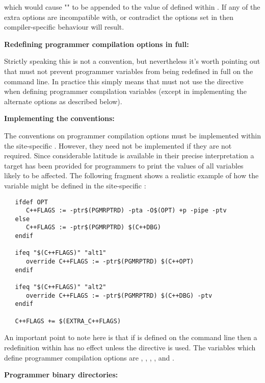 \noindent
which would cause "" to be appended to the value of
 defined within .  If any of the extra options
are incompatible with, or contradict the options set in  then
compiler-specific behaviour will result.

\textbf{Redefining programmer compilation options in full:}

Strictly speaking this is not a  convention, but nevertheless
it's worth pointing out that  must not prevent programmer
variables from being redefined in full on the  command line.  In
practice this simply means that  must not use the
 directive when defining programmer compilation variables
(except in implementing the alternate options as described below).

\textbf{Implementing the conventions:}

The conventions on programmer compilation options must be implemented within
the site-specific .  However, they need not be implemented if
they are not required.  Since considerable latitude is available in their
precise interpretation a  target has been provided for
programmers to print the values of all variables likely to be affected.  The
following fragment shows a realistic example of how the 
variable might be defined in the site-specific :

\begin{verbatim}
   ifdef OPT
      C++FLAGS := -ptr$(PGMRPTRD) -pta -O$(OPT) +p -pipe -ptv
   else
      C++FLAGS := -ptr$(PGMRPTRD) $(C++DBG)
   endif

   ifeq "$(C++FLAGS)" "alt1"
      override C++FLAGS := -ptr$(PGMRPTRD) $(C++OPT)
   endif

   ifeq "$(C++FLAGS)" "alt2"
      override C++FLAGS := -ptr$(PGMRPTRD) $(C++DBG) -ptv
   endif

   C++FLAGS += $(EXTRA_C++FLAGS)
\end{verbatim}

\noindent
An important point to note here is that if  is defined on the
command line then a redefinition within  has no effect unless
the  directive is used.  The variables which define programmer
compilation options are , , ,
, and .

\textbf{Programmer binary directories:}

